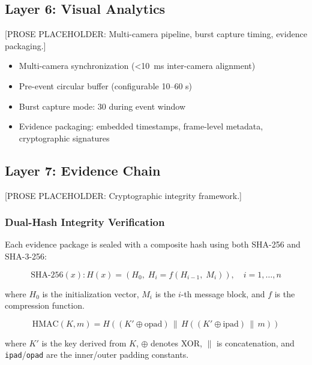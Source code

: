 \documentclass[conference,twocolumn]{IEEEtran}
\begin{document}
\subsection{Layer 6: Visual Analytics}

[PROSE PLACEHOLDER: Multi-camera pipeline, burst capture timing, evidence packaging.]

\begin{itemize}
  \item Multi-camera synchronization (<\SI{10}{\milli\second} inter-camera alignment)
  \item Pre-event circular buffer (configurable 10--60 s)
  \item Burst capture mode: \SI{30}{\fps} during event window
  \item Evidence packaging: embedded timestamps, frame-level metadata, cryptographic signatures
\end{itemize}

\subsection{Layer 7: Evidence Chain}

[PROSE PLACEHOLDER: Cryptographic integrity framework.]

\subsubsection{Dual-Hash Integrity Verification}

Each evidence package is sealed with a composite hash using both SHA-256 and SHA-3-256:

\begin{equation}
\label{eq:sha256}
\text{SHA-256}(x): H(x) = \left(H_0,\; H_i = f\!\left(H_{i-1},\; M_i\right)\right), \quad i = 1, \ldots, n
\end{equation}

where $H_0$ is the initialization vector, $M_i$ is the $i$-th message block, and $f$ is the compression function.

\begin{equation}
\label{eq:hmac}
\text{HMAC}(K, m) = H\!\left(\left(K' \oplus \text{opad}\right) \,\|\, H\!\left(\left(K' \oplus \text{ipad}\right) \,\|\, m\right)\right)
\end{equation}

where $K'$ is the key derived from $K$, $\oplus$ denotes XOR, $\|$ is concatenation, and \texttt{ipad}/\texttt{opad} are the inner/outer padding constants.
\end{document}
